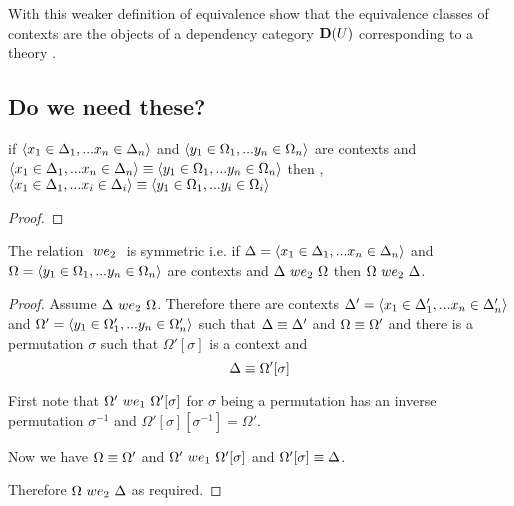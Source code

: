 \documentclass[10pt,a4paper]{scrartcl}
\begin{document}
With this weaker definition of equivalence   show that the 
equivalence classes of contexts are the objects of a dependency category
$\mathbf{D}(U)$ corresponding to a theory \gat. \\

\subsection{Do we need these?}
\begin{lemma}
if $\langle x_1 \in \Delta_1,... x_{n} \in \Delta_{n}\rangle$ 
and $\langle y_1 \in \Omega_1,... y_{n} \in \Omega_{n}\rangle$ are contexts 
and $\langle x_1 \in \Delta_1,... x_{n} \in \Delta_{n}\rangle \equiv \langle y_1 \in \Omega_1,... y_{n} \in \Omega_{n}\rangle$ 
then \foreachi,  $\langle x_1 \in \Delta_1,... x_{i} \in \Delta_{i}\rangle \equiv \langle y_1 \in \Omega_1,... y_{i} \in \Omega_{i}\rangle$
\end{lemma}
\begin{proof}
\end{proof}

\begin{lemma}
The relation $\ we_2\ $ is 
symmetric i.e. if $\Delta=\langle x_1 \in \Delta_1,... x_{n} \in \Delta_{n}\rangle$ 
and $\Omega = \langle y_1 \in \Omega_1,... y_{n} \in \Omega_{n}\rangle$ are contexts 
and $\Delta\ we_2\ \Omega$ 
then $\Omega\ we_2\ \Delta$.
\end{lemma}
\begin{proof}
Assume $\Delta\ we_2\ \Omega$. Therefore there are contexts $\Delta'=\langle x_1 \in \Delta'_1,... x_{n} \in \Delta'_{n}\rangle$ and $\Omega' = \langle y_1 \in \Omega'_1,... y_{n} \in \Omega'_{n}\rangle$  such that $\Delta \equiv \Delta'$ and $\Omega \equiv \Omega'$ and there is a permutation $\sigma$ such that $\Omega'[\sigma]$  is a context and 
\begin{equation}
\Delta \equiv \Omega'[\sigma]
\end{equation}

First note that $\Omega'\ we_1\ \Omega'[\sigma]$ for $\sigma$ being a  permutation has an inverse permutation $\sigma^{-1}$ and  $\Omega'[\sigma][\sigma^{-1}]=\Omega'$.

Now we have $\Omega \equiv \Omega'$ and $\Omega'\ we_1\ \Omega'[\sigma]$ and $ \Omega'[\sigma] \equiv  \Delta$.

Therefore $\Omega\ we_2\ \Delta$ as required.
\end{proof}





\end{document}
